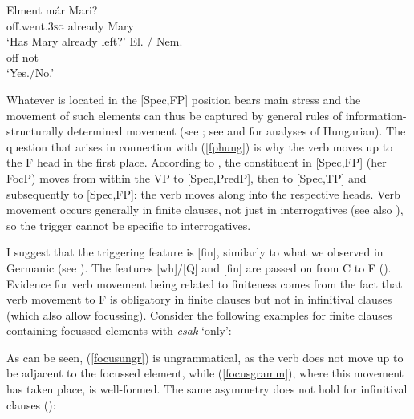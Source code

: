 \begin{exe}
\ex 
\begin{xlist} 
 \gll Elment már Mari?\\
			  off.went.\textsc{3sg} already Mary\\
\glt `Has Mary already left?'
 \gll El. / Nem.\\
		 off {} not\\
\glt `Yes./No.'
\end{xlist}
\end{exe}

Whatever is located in the [Spec,FP] position bears main stress and the movement of such elements can thus be captured by general rules of information-structurally determined movement (see ; see \citealt{ekiss2002, ekiss2008li} and \citealt{szendroi2001diss} for analyses of Hungarian). The question that arises in connection with (\ref{fphung}) is why the verb moves up to the F head in the first place. According to \citet{ekiss2008li}, the constituent in [Spec,FP] (her FocP) moves from within the VP to [Spec,PredP], then to [Spec,TP] and subsequently to [Spec,FP]: the verb moves along into the respective heads. Verb movement occurs generally in finite clauses, not just in interrogatives (see also \citealt{brody1990, brody1995}), so the trigger cannot be specific to interrogatives.

I suggest that the triggering feature is [fin], similarly to what we observed in Germanic (see ). The features [wh]/[Q] and [fin] are passed on from C to F (\citealt{bacskaiatkari2018kenesei}). Evidence for verb movement being related to finiteness comes from the fact that verb movement to F is obligatory in finite clauses but not in infinitival clauses (which also allow focussing). Consider the following examples for finite clauses containing focussed elements with \textit{csak} `only':

\ea
{}
\z
\z

As can be seen, (\ref{focusungr}) is ungrammatical, as the verb does not move up to be adjacent to the focussed element, while (\ref{focusgramm}), where this movement has taken place, is well-formed. The same asymmetry does not hold for infinitival clauses (\citealt[448, ex. 20]{ekiss2008li}):

